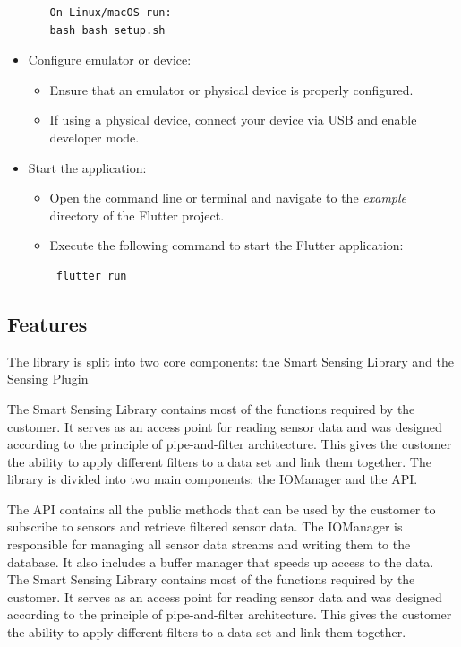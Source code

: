 \documentclass[12pt]{article}
\begin{document}
\begin{itemize}
\begin{itemize}
\begin{verbatim}
On Linux/macOS run:
bash bash setup.sh        
\end{verbatim}        
        \end{itemize}
    \item Configure emulator or device:
        \begin{itemize}
        \item Ensure that an emulator or physical device is properly configured.
        \item If using a physical device, connect your device via USB and enable developer mode.
        \end{itemize}
    \item Start the application:
        \begin{itemize}
        \item Open the command line or terminal and navigate to the \textit{example} directory of the Flutter project.
        \item Execute the following command to start the Flutter application:
\begin{verbatim}
 flutter run
\end{verbatim}        
        \end{itemize}
        

\end{itemize}

\subsection{Features}
The library is split into two core components: the Smart Sensing Library and the Sensing Plugin

The Smart Sensing Library contains most of the functions required by the customer. It serves as an access point for reading sensor data and was designed according to the principle of pipe-and-filter architecture. This gives the customer the ability to apply different filters to a data set and link them together. The library is divided into two main components: the IOManager and the API.

The API contains all the public methods that can be used by the customer to subscribe to sensors and retrieve filtered sensor data. The IOManager is responsible for managing all sensor data streams and writing them to the database. It also includes a buffer manager that speeds up access to the data. The Smart Sensing Library contains most of the functions required by the customer. It serves as an access point for reading sensor data and was designed according to the principle of pipe-and-filter architecture. This gives the customer the ability to apply different filters to a data set and link them together. 
\end{document}

